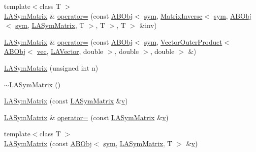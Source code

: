 \begin{DoxyCompactItemize}
\item 
{\footnotesize template$<$class T $>$ }\\\mbox{\hyperlink{classROOT_1_1Minuit2_1_1LASymMatrix}{L\+A\+Sym\+Matrix}} \& \mbox{\hyperlink{classROOT_1_1Minuit2_1_1LASymMatrix_a95fd77b55f726095a231817852fceb7d}{operator=}} (const \mbox{\hyperlink{classROOT_1_1Minuit2_1_1ABObj}{A\+B\+Obj}}$<$ \mbox{\hyperlink{classROOT_1_1Minuit2_1_1sym}{sym}}, \mbox{\hyperlink{classROOT_1_1Minuit2_1_1MatrixInverse}{Matrix\+Inverse}}$<$ \mbox{\hyperlink{classROOT_1_1Minuit2_1_1sym}{sym}}, \mbox{\hyperlink{classROOT_1_1Minuit2_1_1ABObj}{A\+B\+Obj}}$<$ \mbox{\hyperlink{classROOT_1_1Minuit2_1_1sym}{sym}}, \mbox{\hyperlink{classROOT_1_1Minuit2_1_1LASymMatrix}{L\+A\+Sym\+Matrix}}, T $>$, T $>$, T $>$ \&inv)
\item 
\mbox{\hyperlink{classROOT_1_1Minuit2_1_1LASymMatrix}{L\+A\+Sym\+Matrix}} \& \mbox{\hyperlink{classROOT_1_1Minuit2_1_1LASymMatrix_a166f84f8396e20c14225ae139ba6af25}{operator=}} (const \mbox{\hyperlink{classROOT_1_1Minuit2_1_1ABObj}{A\+B\+Obj}}$<$ \mbox{\hyperlink{classROOT_1_1Minuit2_1_1sym}{sym}}, \mbox{\hyperlink{classROOT_1_1Minuit2_1_1VectorOuterProduct}{Vector\+Outer\+Product}}$<$ \mbox{\hyperlink{classROOT_1_1Minuit2_1_1ABObj}{A\+B\+Obj}}$<$ \mbox{\hyperlink{classROOT_1_1Minuit2_1_1vec}{vec}}, \mbox{\hyperlink{classROOT_1_1Minuit2_1_1LAVector}{L\+A\+Vector}}, double $>$, double $>$, double $>$ \&)
\item 
\mbox{\hyperlink{classROOT_1_1Minuit2_1_1LASymMatrix_a9fe58788095d0860bb44bde53457782c}{L\+A\+Sym\+Matrix}} (unsigned int n)
\item 
\mbox{\hyperlink{classROOT_1_1Minuit2_1_1LASymMatrix_a6de4c2f5940002a13411348985d1b784}{$\sim$\+L\+A\+Sym\+Matrix}} ()
\item 
\mbox{\hyperlink{classROOT_1_1Minuit2_1_1LASymMatrix_ac74006982da0bcda789c1237e0022033}{L\+A\+Sym\+Matrix}} (const \mbox{\hyperlink{classROOT_1_1Minuit2_1_1LASymMatrix}{L\+A\+Sym\+Matrix}} \&\mbox{\hyperlink{adat__devel_2lib_2hadron_2hadron__timeslice_8cc_a716fc87f5e814be3ceee2405ed6ff22a}{v}})
\item 
\mbox{\hyperlink{classROOT_1_1Minuit2_1_1LASymMatrix}{L\+A\+Sym\+Matrix}} \& \mbox{\hyperlink{classROOT_1_1Minuit2_1_1LASymMatrix_a31521afba8179a28e7744af51850922e}{operator=}} (const \mbox{\hyperlink{classROOT_1_1Minuit2_1_1LASymMatrix}{L\+A\+Sym\+Matrix}} \&\mbox{\hyperlink{adat__devel_2lib_2hadron_2hadron__timeslice_8cc_a716fc87f5e814be3ceee2405ed6ff22a}{v}})
\item 
{\footnotesize template$<$class T $>$ }\\\mbox{\hyperlink{classROOT_1_1Minuit2_1_1LASymMatrix_ab44b18a4c1b65cb054c884661843a4a0}{L\+A\+Sym\+Matrix}} (const \mbox{\hyperlink{classROOT_1_1Minuit2_1_1ABObj}{A\+B\+Obj}}$<$ \mbox{\hyperlink{classROOT_1_1Minuit2_1_1sym}{sym}}, \mbox{\hyperlink{classROOT_1_1Minuit2_1_1LASymMatrix}{L\+A\+Sym\+Matrix}}, T $>$ \&\mbox{\hyperlink{adat__devel_2lib_2hadron_2hadron__timeslice_8cc_a716fc87f5e814be3ceee2405ed6ff22a}{v}})

\end{DoxyCompactItemize}
